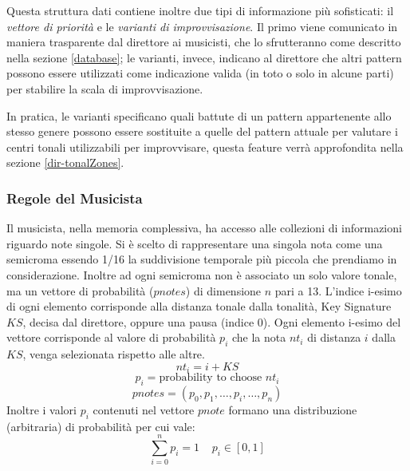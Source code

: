 Questa struttura dati contiene inoltre due tipi di informazione più sofisticati: il \emph{vettore di priorità} e le \emph{varianti di improvvisazione}. Il primo viene comunicato in maniera trasparente dal direttore ai musicisti, che lo sfrutteranno come descritto nella sezione \ref{database}; le varianti, invece, indicano al direttore che altri pattern possono essere utilizzati come indicazione valida (in toto o solo in alcune parti) per stabilire la scala di improvvisazione.

In pratica, le varianti specificano quali battute di un pattern appartenente allo stesso genere possono essere sostituite a quelle del pattern attuale per valutare i centri tonali utilizzabili per improvvisare, questa feature verrà approfondita nella sezione \ref{dir-tonalZones}.


\subsubsection*{Regole del Musicista}
\label{patterneregole}
Il musicista, nella memoria complessiva, ha accesso alle collezioni di
informazioni riguardo note singole. 
Si è scelto di rappresentare una singola nota come una semicroma essendo 
1/16 la suddivisione temporale più piccola che prendiamo in considerazione.
Inoltre ad ogni semicroma non è associato un solo valore tonale, ma un
vettore di probabilità ($pnotes$) di dimensione $n$ pari a 13. L'indice i-esimo
di ogni elemento corrisponde alla distanza tonale dalla tonalità, 
Key Signature $KS$, decisa dal direttore, oppure una pausa (indice 0). 
Ogni elemento i-esimo del vettore 
corrisponde al valore di probabilità $p_i$ che la nota $nt_i$ di distanza 
$i$ dalla $KS$, venga selezionata rispetto alle altre.
\[nt_i = i + KS \]
\[p_i = \text{probability to choose  } nt_i \]
\begin{equation}
\label{eq-pnotes}
pnotes = (p_0, p_1,  \ldots , p_i, \ldots, p_n)
\end{equation}
Inoltre i valori $p_i$ contenuti nel vettore $pnote$ formano una distribuzione 
(arbitraria) di probabilità per cui vale:
\begin{equation}
\sum_{i=0}^{n} p_i = 1 \;\;\;\; p_i \in [0, 1]
\end{equation}

